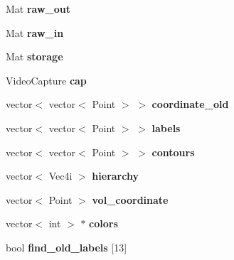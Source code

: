 \begin{DoxyCompactItemize}
\item 
\hypertarget{classvision_ae5f3eff88240c3cb76eb6b6018cc7fea}{Mat {\bfseries raw\-\_\-out}}\label{classvision_ae5f3eff88240c3cb76eb6b6018cc7fea}

\item 
\hypertarget{classvision_a8be17d4889ad9b9154f3d90825893b70}{Mat {\bfseries raw\-\_\-in}}\label{classvision_a8be17d4889ad9b9154f3d90825893b70}

\item 
\hypertarget{classvision_adf6eda2658af488a78cbf3d4e9fc9612}{Mat {\bfseries storage}}\label{classvision_adf6eda2658af488a78cbf3d4e9fc9612}

\item 
\hypertarget{classvision_a6ce35c3216f36f741a0fab54e815d820}{Video\-Capture {\bfseries cap}}\label{classvision_a6ce35c3216f36f741a0fab54e815d820}

\item 
\hypertarget{classvision_a3d8aa1ce75f36f4bb0c2270100a1a0df}{vector$<$ vector$<$ Point $>$ $>$ {\bfseries coordinate\-\_\-old}}\label{classvision_a3d8aa1ce75f36f4bb0c2270100a1a0df}

\item 
\hypertarget{classvision_a2a7fa3ec56b81484eb06c0f5c068365a}{vector$<$ vector$<$ Point $>$ $>$ {\bfseries labels}}\label{classvision_a2a7fa3ec56b81484eb06c0f5c068365a}

\item 
\hypertarget{classvision_a77ade58544c4db2587686e73d227cc37}{vector$<$ vector$<$ Point $>$ $>$ {\bfseries contours}}\label{classvision_a77ade58544c4db2587686e73d227cc37}

\item 
\hypertarget{classvision_a04a535405c5d7b076299073194f497b4}{vector$<$ Vec4i $>$ {\bfseries hierarchy}}\label{classvision_a04a535405c5d7b076299073194f497b4}

\item 
\hypertarget{classvision_a4f28ab3ac6e168aa977725da1973399b}{vector$<$ Point $>$ {\bfseries vol\-\_\-coordinate}}\label{classvision_a4f28ab3ac6e168aa977725da1973399b}

\item 
\hypertarget{classvision_a7a1ac84ff70026be06b4ffe17fb0f3aa}{vector$<$ int $>$ $\ast$ {\bfseries colors}}\label{classvision_a7a1ac84ff70026be06b4ffe17fb0f3aa}

\item 
\hypertarget{classvision_a08b91dbb2384d4c6bd78560ec6621246}{bool {\bfseries find\-\_\-old\-\_\-labels} \mbox{[}13\mbox{]}}\label{classvision_a08b91dbb2384d4c6bd78560ec6621246}


\end{DoxyCompactItemize}
